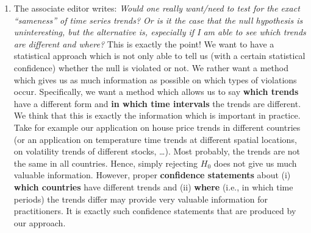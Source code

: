 \documentclass[a4paper,12pt]{article}
\newcommand{\reference}[1]{\textcolor{black}{#1}}
\begin{document}
\begin{enumerate}[label=\arabic*.,leftmargin=0.6cm]


\begin{enumerate}[leftmargin=0.7cm]

\item The associate editor writes: \textit{Would one really want/need to test for the exact ``sameness'' of time series trends? Or is it the case that the null hypothesis is uninteresting, but the alternative is, especially if I am able to see which trends are different and where?} This is exactly the point! We want to have a statistical approach which is not only able to tell us (with a certain statistical confidence) whether the null is violated or not. We rather want a method which gives us as much information as possible on which types of violations occur. Specifically, we want a method which allows us to say \textbf{which trends} have a different form and \textbf{in which time intervals} the trends are different. We think that this is exactly the information which is important in practice. Take for example our application on house price trends in different countries (or an application on temperature time trends at different spatial locations, on volatility trends of different stocks, \ldots). Most probably, the trends are not the same in all countries.
Hence, simply rejecting $H_0$ does not give us much valuable information. However, proper \textbf{confidence statements} about (i) \textbf{which countries} have different trends and (ii) \textbf{where} (i.e., in which time periods) the trends differ may provide very valuable information for practitioners. It is exactly such confidence statements that are produced by our approach. 


\end{enumerate}
\end{enumerate}
\end{document}
